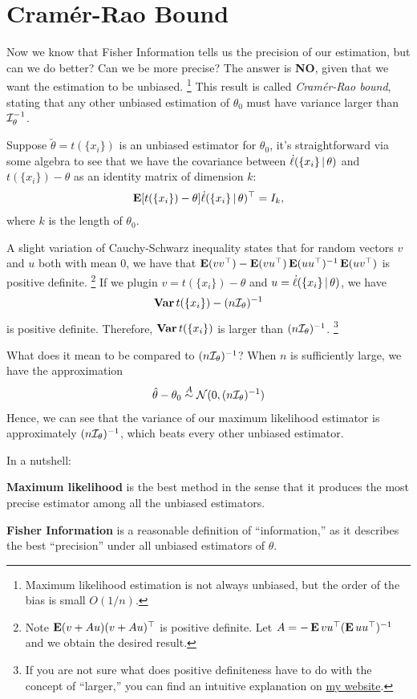 \documentclass[a4paper]{article}
\begin{document}
\section{Cramér-Rao Bound}

Now we know that Fisher Information tells us the precision of our estimation,
but can we do better?
Can we be more precise?
The answer is \textbf{NO}, given that we want the estimation to be unbiased.
\footnote{
	Maximum likelihood estimation is not always unbiased,
	but the order of the bias is small $O(1/n)$.
}
This result is called \emph{Cramér-Rao bound},
stating that any other unbiased estimation of $\theta_0$ must have variance larger than $\mathcal{I}_{\theta}^{-1}$.

Suppose $\tilde\theta=t(\{x_i\})$ is an unbiased estimator for $\theta_0$,
it's straightforward via some algebra to see that
we have the covariance between $\dot\ell(\{x_i\}\,|\,\theta)$
and $t(\{x_i\})-\theta$ as an identity matrix of dimension $k$:
\begin{align*}
\operatorname{\text{\textrm{\upshape\textbf{E}}}} [t(\{x_i\})-\theta] \dot\ell(\{x_i\}\,|\,\theta)^{\top}
= I_k,
\end{align*}
where $k$ is the length of $\theta_0$.

A slight variation of Cauchy-Schwarz inequality states that
for random vectors $v$ and $u$ both with mean $0$, we have that
$\operatorname{\text{\textrm{\upshape\textbf{E}}}}(vv^{\top}) - \operatorname{\text{\textrm{\upshape\textbf{E}}}}(vu^{\top})\operatorname{\text{\textrm{\upshape\textbf{E}}}}(uu^{\top})^{-1}\operatorname{\text{\textrm{\upshape\textbf{E}}}}(uv^{\top})$
is positive definite. 
\footnote{
	Note $\operatorname{\text{\textrm{\upshape\textbf{E}}}}(v+Au)(v+Au)^{\top}$ is positive definite.
	Let $A=-\operatorname{\text{\textrm{\upshape\textbf{E}}}}{vu^{\top}}(\operatorname{\text{\textrm{\upshape\textbf{E}}}}{uu^{\top}})^{-1}$ and we obtain the desired result.
}
If we plugin $v=t(\{x_i\})-\theta$ and $u=\dot\ell(\{x_i\}\,|\,\theta)$,
we have
\begin{align*}
	\operatorname{\text{\textrm{\upshape\textbf{Var}}}} t(\{x_i\}) - (n\mathcal{I}_{\theta})^{-1}
\end{align*}
is positive definite.
Therefore, $\operatorname{\text{\textrm{\upshape\textbf{Var}}}}{t(\{x_i\})}$ is larger than $(n\mathcal{I}_{\theta})^{-1}$.
\footnote{
	If you are not sure what does positive definiteness have to do with the concept of ``larger,''
	you can find an intuitive explanation on \href{https://jessekelighine.com}{my website}.
}

What does it mean to be compared to $(n\mathcal{I}_\theta)^{-1}$?
When $n$ is sufficiently large, we have the approximation
\begin{align*}
	\hat\theta - \theta_0 \overset{A}{\sim} \mathcal{N}(0,(n\mathcal{I}_\theta)^{-1})
\end{align*}
Hence, we can see that the variance of our maximum likelihood estimator is approximately $(n\mathcal{I}_{\theta})^{-1}$,
which beats every other unbiased estimator.

\dinkus

\noindent
In a nutshell:

\begin{tcolorbox}[mycolorbox={myblue}]
	\textbf{Maximum likelihood} is the best method
	in the sense that it produces the most precise estimator among all the unbiased estimators.
\end{tcolorbox}

\begin{tcolorbox}[mycolorbox={myblue}]
	\textbf{Fisher Information} is a reasonable definition of ``information,''
	as it describes the best ``precision'' under all unbiased estimators of $\theta$.
\end{tcolorbox}
\end{document}
